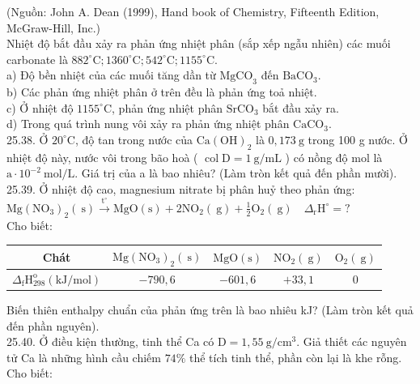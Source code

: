 \documentclass[10pt]{article}
\begin{document}
(Nguồn: John A. Dean (1999), Hand book of Chemistry, Fifteenth Edition, McGraw-Hill, Inc.)\\
Nhiệt độ bắt đầu xảy ra phản ứng nhiệt phân (sắp xếp ngẫu nhiên) các muối carbonate là $882^{\circ} \mathrm{C} ; 1360^{\circ} \mathrm{C} ; 542^{\circ} \mathrm{C} ; 1155^{\circ} \mathrm{C}$.\\
a) Độ bền nhiệt của các muối tăng dần từ $\mathrm{MgCO}_{3}$ đến $\mathrm{BaCO}_{3}$.\\
b) Các phản ứng nhiệt phân ở trên đều là phản ứng toả nhiệt.\\
c) Ở nhiệt độ $1155^{\circ} \mathrm{C}$, phản ứng nhiệt phân $\mathrm{SrCO}_{3}$ bắt đầu xảy ra.\\
d) Trong quá trình nung vôi xảy ra phản ứng nhiệt phân $\mathrm{CaCO}_{3}$.\\
25.38. Ở $20^{\circ} \mathrm{C}$, độ tan trong nước của $\mathrm{Ca}(\mathrm{OH})_{2}$ là $0,173 \mathrm{~g}$ trong 100 g nước. Ở nhiệt độ này, nước vôi trong bão hoà ( $\operatorname{col} \mathrm{D}=1 \mathrm{~g} / \mathrm{mL}$ ) có nồng độ mol là $\mathrm{a} \cdot 10^{-2} \mathrm{~mol} / \mathrm{L}$. Giá trị của a là bao nhiêu? (Làm tròn kết quả đến phần mười).\\
25.39. Ở nhiệt độ cao, magnesium nitrate bị phân huỷ theo phản ứng:\\
$\mathrm{Mg}\left(\mathrm{NO}_{3}\right)_{2}(\mathrm{~s}) \xrightarrow{\mathrm{t}^{\circ}} \mathrm{MgO}(\mathrm{s})+2 \mathrm{NO}_{2}(\mathrm{~g})+\frac{1}{2} \mathrm{O}_{2}(\mathrm{~g}) \quad \Delta_{\mathrm{r}} \mathrm{H}^{\circ}=?$\\
Cho biết:

\begin{center}
\begin{tabular}{|c|c|c|c|c|}
\hline
Chát & $\mathrm{Mg}\left(\mathrm{NO}_{3}\right)_{2}(\mathrm{~s})$ & $\mathrm{MgO}(\mathrm{s})$ & $\mathrm{NO}_{2}(\mathrm{~g})$ & $\mathrm{O}_{2}(\mathrm{~g})$ \\
\hline
$\Delta_{\mathrm{f}} \mathrm{H}_{298}^{\mathrm{o}}(\mathrm{kJ} / \mathrm{mol})$ & $-790,6$ & $-601,6$ & $+33,1$ & 0 \\
\hline
\end{tabular}
\end{center}

Biến thiên enthalpy chuẩn của phản ứng trên là bao nhiêu kJ? (Làm tròn kết quả đến phần nguyên).\\
25.40. Ở điều kiện thường, tinh thể Ca có $\mathrm{D}=1,55 \mathrm{~g} / \mathrm{cm}^{3}$. Giả thiết các nguyên tử Ca là những hình cầu chiếm $74 \%$ thể tích tinh thể, phần còn lại là khe rỗng. Cho biết:
\end{document}
